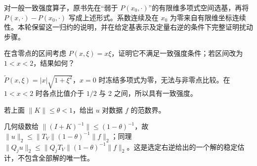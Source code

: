 对一般一致强度算子，原书先在“弱于 $P(x_0,\cdot)$”的有限维多项式空间选基，再将 $P(x,\cdot)-P(x_0,\cdot)$ 写成上述形式。系数连续及在 $x_0$ 为零来自有限维坐标连续性。本轮保留这一归约的说明，并在给定基表示及定量右逆的条件下完整证明扰动步骤。

\begin{exercise}[强度可因退化而改变]\label{ex:y6-degenerate-strength}
在含零点的区间考虑 $P(x,\xi)=x\xi$，证明它不满足一致强度条件；若区间改为 $1<x<2$，结果如何？
\end{exercise}
\begin{solution}
$\widetilde P(x,\xi)=|x|\sqrt{1+\xi^2}$，$x=0$ 时冻结多项式为零，无法与非零点比较。在 $1<x<2$ 时各点比值介于 $1/2$ 与 2 之间，所以具有一致强度。
\end{solution}

\begin{exercise}[Neumann 界]\label{ex:y6-neumann-bound}
若上面 $\|K\|\le\theta<1$，给出 $u$ 对数据 $f$ 的范数界。
\end{exercise}
\begin{solution}
几何级数给 $\|(I+K)^{-1}\|\le(1-\theta)^{-1}$，故 $\|u\|_2\le\|T_V\|(1-\theta)^{-1}\|f\|_2$；同理 $\|Q_ju\|_2\le\|Q_jT_V\|(1-\theta)^{-1}\|f\|_2$。这是选定右逆给出的一个解的稳定估计，不包含全部解的唯一性。
\end{solution}
